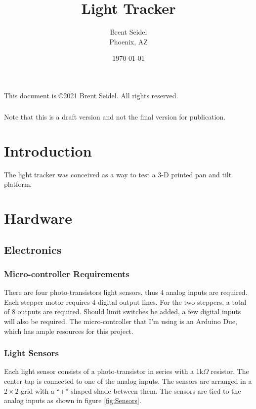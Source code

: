\documentclass[10pt, openany]{book}
\title{Light Tracker}
\author{Brent Seidel \\ Phoenix, AZ}
\date{ \today }
\begin{document}
%
%
\frontmatter
\maketitle
\begin{center}
This document is \copyright 2021 Brent Seidel.  All rights reserved.

\paragraph{}Note that this is a draft version and not the final version for publication.
\end{center}
\tableofcontents

\mainmatter
\chapter{Introduction}
The light tracker was conceived as a way to test a 3-D printed pan and tilt platform.

\chapter{Hardware}
\section{Electronics}
\subsection{Micro-controller Requirements}
There are four photo-transistors light sensors, thus 4 analog inputs are required.  Each stepper motor requires 4 digital output lines.  For the two steppers, a total of 8 outputs are required.  Should limit switches be added, a few digital inputs will also be required.  The micro-controller that I'm using is an Arduino Due, which has ample resources for this project.

\subsection{Light Sensors}
Each light sensor consists of a photo-transistor in series with a 1k$\Omega$ resistor.  The center tap is connected to one of the analog inputs.  The sensors are arranged in a $2 \times 2$ grid with a ``+'' shaped shade between them.  The sensors are tied to the analog inputs as shown in figure \ref{fig:Sensors}.
\end{document}
